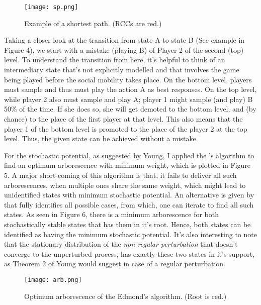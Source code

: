 \documentclass[11pt, a4paper, leqno]{article}
\begin{document}
        
\begin{figure}
            \centering
            \texttt{[image: sp.png]}
            \caption{Example of a shortest path. (RCCs are red.)}
            \label{fig:sp}
        \end{figure}
   

Taking a closer look at the transition from state A to state B (See example in Figure 4), we start with a mistake (playing B) of Player 2 of the second (top) level. To understand the transition from here, it's helpful to think of an intermediary state that's not explicitly modelled and that involves the game being played before the social mobility takes place. On the bottom level, players must sample and thus must play the action A as best responses. On the top level, while player 2 also must sample and play A; player 1 might sample (and play) B 50\% of the time. If she does so, she will get demoted to the bottom level, and (by chance) to the place of the first player at that level. This also means that the player 1 of the bottom level is promoted to the place of the player 2 at the top level. Thus, the given state can be achieved without a mistake.




For the stochastic potential, as suggested by Young, I applied the \citet{edmonds1967optimum}'s algorithm to find an optimum arborescence with minimum weight, which is plotted in Figure 5. A major short-coming of this algorithm is that, it fails to deliver all such arborescences, when multiple ones share the same weight, which might lead to unidentified states with minimum stochastic potential. An alternative is given by \citet{sorensen2005algorithm} that fully identifies all possible cases, from which, one can iterate to find all such states. As seen in Figure 6, there is a minimum arborescence for both stochastically stable states that has them in it's root. Hence, both states can be identified as having the minimum stochastic potential. It's also interesting to note that the stationary distribution of the \textit{non-regular perturbation} that doesn't converge to the unperturbed process, has exactly these two states in it's support, as Theorem 2 of Young would suggest in case of a regular perturbation.


\begin{figure}
        \centering
        \texttt{[image: arb.png]}
        \caption{Optimum arborescence of the Edmond's algorithm. (Root is red.)}
        \label{fig:arb}
    \end{figure}
\end{document}
